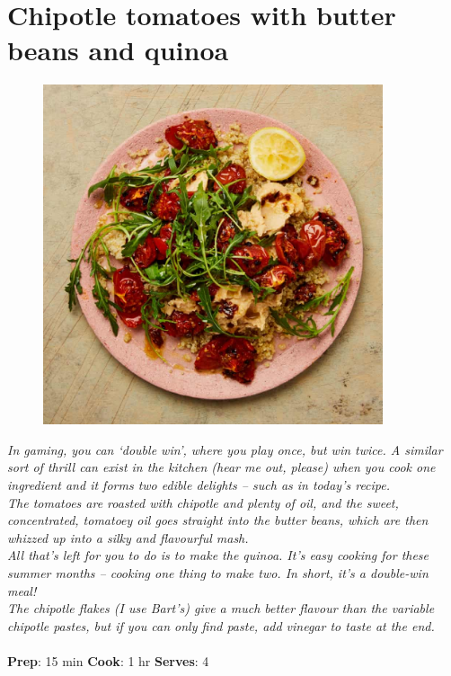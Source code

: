 \documentclass{book}
\begin{document}
\section{Chipotle tomatoes with butter beans and quinoa}
\begin{figure}
\centering\includegraphics[width=10cm,height=10cm,keepaspectratio]{Recipe_Pictures/Chipotle_tomatoes_with_butter_beans_and_quinoa.png}
\end{figure}
\emph{In gaming, you can ‘double win’, where you play once, but win twice. A similar sort of thrill can exist in the kitchen (hear me out, please) when you cook one ingredient and it forms two edible delights – such as in today’s recipe.\\ 
The tomatoes are roasted with chipotle and plenty of oil, and the sweet, concentrated, tomatoey oil goes straight into the butter beans, which are then whizzed up into a silky and flavourful mash.\\ 
All that’s left for you to do is to make the quinoa. It’s easy cooking for these summer months – cooking one thing to make two. In short, it’s a double-win meal!\\ 
The chipotle flakes (I use Bart’s) give a much better flavour than the variable chipotle pastes, but if you can only find paste, add vinegar to taste at the end.}\\\\ 
\textbf{Prep}: 15 min
\textbf{Cook}: 1 hr
\textbf{Serves}: 4
\end{document}
